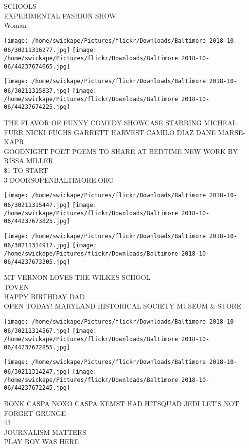 \documentclass[10pt,letterpaper]{article}
\begin{document}
SCHOOLS\\
EXPERIMENTAL FASHION SHOW\\
Woman\\
\pagebreak

\texttt{[image: /home/swickape/Pictures/flickr/Downloads/Baltimore 2018-10-06/30211316277.jpg]}
\texttt{[image: /home/swickape/Pictures/flickr/Downloads/Baltimore 2018-10-06/44237674665.jpg]}

\texttt{[image: /home/swickape/Pictures/flickr/Downloads/Baltimore 2018-10-06/30211315837.jpg]}
\texttt{[image: /home/swickape/Pictures/flickr/Downloads/Baltimore 2018-10-06/44237674225.jpg]}

THE FLAVOR OF FUNNY COMEDY SHOWCASE STARRING MICHEAL FURR NICKI FUCHS GARRETT HARVEST CAMILO DIAZ DANE MARSE{-}KAPR\\
GOODNIGHT POET POEMS TO SHARE AT BEDTIME NEW WORK BY RISSA MILLER\\
\$1 TO START\\
3 DOORSOPENBALTIMORE.ORG\\
\pagebreak

\texttt{[image: /home/swickape/Pictures/flickr/Downloads/Baltimore 2018-10-06/30211315447.jpg]}
\texttt{[image: /home/swickape/Pictures/flickr/Downloads/Baltimore 2018-10-06/44237673825.jpg]}

\texttt{[image: /home/swickape/Pictures/flickr/Downloads/Baltimore 2018-10-06/30211314917.jpg]}
\texttt{[image: /home/swickape/Pictures/flickr/Downloads/Baltimore 2018-10-06/44237673305.jpg]}

MT VERNON LOVES THE WILKES SCHOOL\\
TOVEN\\
HAPPY BIRTHDAY DAD\\
OPEN TODAY!  MARYLAND HISTORICAL SOCIETY MUSEUM \& STORE\\
\pagebreak

\texttt{[image: /home/swickape/Pictures/flickr/Downloads/Baltimore 2018-10-06/30211314567.jpg]}
\texttt{[image: /home/swickape/Pictures/flickr/Downloads/Baltimore 2018-10-06/44237672855.jpg]}

\texttt{[image: /home/swickape/Pictures/flickr/Downloads/Baltimore 2018-10-06/30211314247.jpg]}
\texttt{[image: /home/swickape/Pictures/flickr/Downloads/Baltimore 2018-10-06/44237672245.jpg]}

BONK CASPA NOXO CASPA KEMST HAD HITSQUAD JEDI LET'S NOT FORGET GRUNGE\\
43\\
JOURNALISM MATTERS\\
PLAY BOY WAS HERE\\
\pagebreak
\end{document}

